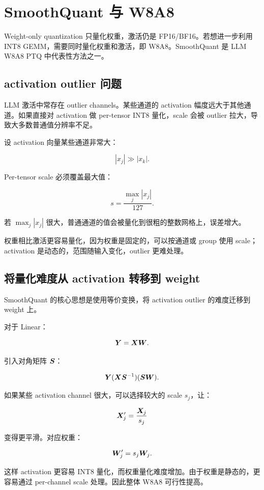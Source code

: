 \section{SmoothQuant 与 W8A8}
\label{sec:smoothquant-w8a8}

Weight-only quantization 只量化权重，激活仍是 FP16/BF16。若想进一步利用 INT8 GEMM，需要同时量化权重和激活，即 W8A8。SmoothQuant 是 LLM W8A8 PTQ 中代表性方法之一。

\subsection{activation outlier 问题}
\label{subsec:activation-outlier-problem}

LLM 激活中常存在 outlier channels。某些通道的 activation 幅度远大于其他通道。如果直接对 activation 做 per-tensor INT8 量化，scale 会被 outlier 拉大，导致大多数普通值分辨率不足。

设 activation 向量某些通道非常大：

\[
|x_j|\gg |x_k|.
\]

Per-tensor scale 必须覆盖最大值：

\[
s=\frac{\max_j |x_j|}{127}.
\]

若 $\max_j |x_j|$ 很大，普通通道的值会被量化到很粗的整数网格上，误差增大。

权重相比激活更容易量化，因为权重是固定的，可以按通道或 group 使用 scale；activation 是动态的，范围随输入变化，outlier 更难处理。

\subsection{将量化难度从 activation 转移到 weight}
\label{subsec:smoothquant-migrate-difficulty}

SmoothQuant 的核心思想是使用等价变换，将 activation outlier 的难度迁移到 weight 上。

对于 Linear：

\[
\bm{Y}=\bm{X}\bm{W}.
\]

引入对角矩阵 $\bm{S}$：

\[
\bm{Y}
(\bm{X}\bm{S}^{-1})
(\bm{S}\bm{W}).
\]

如果某些 activation channel 很大，可以选择较大的 scale $s_j$，让：

\[
\bm{X}'_j=\frac{\bm{X}_j}{s_j}
\]

变得更平滑。对应权重：

\[
\bm{W}'_j=s_j\bm{W}_j.
\]

这样 activation 更容易 INT8 量化，而权重量化难度增加。由于权重是静态的，更容易通过 per-channel scale 处理。因此整体 W8A8 可行性提高。

